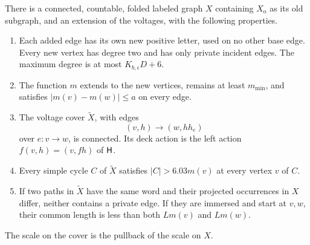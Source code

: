 \begin{lemma}\label{lem:private-completion}
There is a connected, countable, folded labeled graph $X$ containing
$X_{\mathrm o}$ as its old subgraph, and an extension of the voltages, with
the following properties.
\begin{enumerate}
\item Each added edge has its own new positive letter, used on no other
 base edge.  Every new vertex has degree two and has only private incident
 edges.  The maximum degree is at most $K_{b,\epsilon}D+6$.
\item The function $m$ extends to the new vertices, remains at least
 $m_{\min}$, and satisfies $|m(v)-m(w)|\le a$ on every edge.
\item The voltage cover $\widetilde X$, with edges
 \begin{equation}\label{eq:voltage-convention}
 (v,h)\longrightarrow(w,hh_e)
 \end{equation}
 over $e\colon v\to w$, is connected.  Its deck action is the left action
 $f(v,h)=(v,fh)$ of $\mathsf H$.
\item Every simple cycle $C$ of $\widetilde X$ satisfies
 $|C|>6.03m(v)$ at every vertex $v$ of $C$.
\item If two paths in $\widetilde X$ have the same word and their projected
 occurrences in $X$ differ, neither contains a private edge.  If they are
 immersed and start at $v,w$, their common length is less than both
 $Lm(v)$ and $Lm(w)$.
\end{enumerate}
The scale on the cover is the pullback of the scale on $X$.
\end{lemma}

